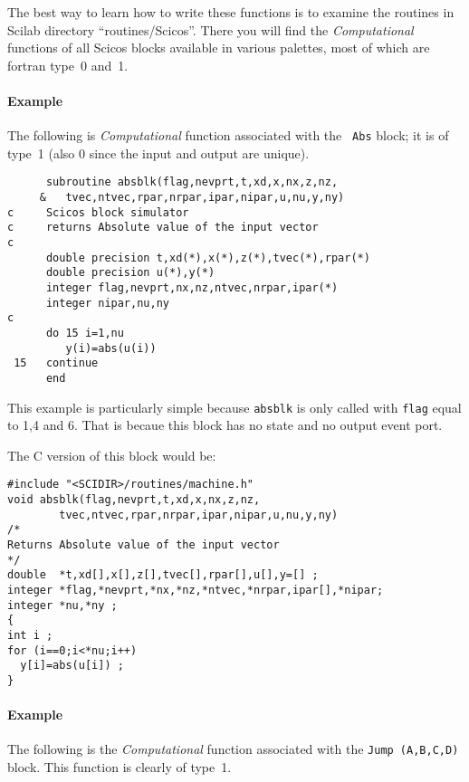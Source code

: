\documentclass{book}
\newcommand{\computational}{{\em Computational }}
\begin{document}
\medskip

The best way to learn how to write these functions is to examine the
routines in Scilab directory ``routines/Scicos''. There you
will find the \computational functions of all Scicos   blocks available
in various palettes, most of which are fortran type~0 and~1.

\paragraph{Example}

The following is \computational function associated with the {\tt
Abs} block; it is of type~1 (also 0 since the input and output are
unique).

\begin{verbatim}
      subroutine absblk(flag,nevprt,t,xd,x,nx,z,nz,
     &   tvec,ntvec,rpar,nrpar,ipar,nipar,u,nu,y,ny)
c     Scicos block simulator
c     returns Absolute value of the input vector
c
      double precision t,xd(*),x(*),z(*),tvec(*),rpar(*)
      double precision u(*),y(*)
      integer flag,nevprt,nx,nz,ntvec,nrpar,ipar(*)
      integer nipar,nu,ny
c
      do 15 i=1,nu
         y(i)=abs(u(i))
 15   continue
      end
\end{verbatim}


This example is particularly simple because {\tt absblk} is only
called with {\tt flag} equal to 1,4 and 6. That is becaue this block has no
state and no output event port. 

\bigskip

The C version of this block would be:
\label{exc} 

\begin{verbatim}
#include "<SCIDIR>/routines/machine.h"
void absblk(flag,nevprt,t,xd,x,nx,z,nz,
        tvec,ntvec,rpar,nrpar,ipar,nipar,u,nu,y,ny)
/*
Returns Absolute value of the input vector
*/
double  *t,xd[],x[],z[],tvec[],rpar[],u[],y=[] ;
integer *flag,*nevprt,*nx,*nz,*ntvec,*nrpar,ipar[],*nipar;
integer *nu,*ny ;
{
int i ;
for (i==0;i<*nu;i++)
  y[i]=abs(u[i]) ;
}
\end{verbatim}


\paragraph{Example}
The following is the \computational
function associated with the {\tt Jump (A,B,C,D)} block. This function
is clearly of type~1.
\end{document}
